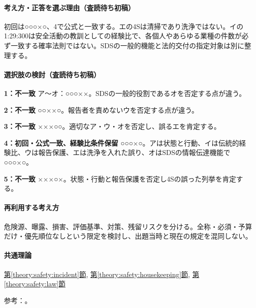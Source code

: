 \paragraph{考え方・正答を選ぶ理由（査読待ち初稿）} 初回は○○○×○、4で公式と一致する。エの4Sは清掃であり洗浄ではない。イの1:29:300は安全活動の教訓としての経験比で、各個人やあらゆる業種の件数が必ず一致する確率法則ではない。SDSの一般的機能と法的交付の指定対象は別に整理する。

\paragraph{選択肢の検討（査読待ち初稿）}\mbox{}\par

\noindent\textbf{1：不一致} ア〜オ：○○○××。SDSの一般的役割であるオを否定する点が違う。\par

\noindent\textbf{2：不一致} ○○××○。報告者を責めないウを否定する点が違う。\par

\noindent\textbf{3：不一致} ×××○○。適切なア・ウ・オを否定し、誤るエを肯定する。\par

\noindent\textbf{4：初回・公式一致、経験比条件保留} ○○○×○。アは状態と行動、イは伝統的経験比、ウは報告保護、エは洗浄を入れた誤り、オはSDSの情報伝達機能で○○○×○。\par

\noindent\textbf{5：不一致} ×××○×。状態・行動と報告保護を否定し4Sの誤った列挙を肯定する。\par

\paragraph{再利用する考え方} 危険源、曝露、損害、評価基準、対策、残留リスクを分ける。全称・必須・予算だけ・優先順位なしという限定を検討し、出題当時と現在の規定を混同しない。

\paragraph{共通理論} \hyperref[theory:safety:incident]{第\ref*{theory:safety:incident}節}, \hyperref[theory:safety:housekeeping]{第\ref*{theory:safety:housekeeping}節}, \hyperref[theory:safety:law]{第\ref*{theory:safety:law}節}

\par 参考：\cite{saf_welfare,saf_4s,saf_chemqa}。

